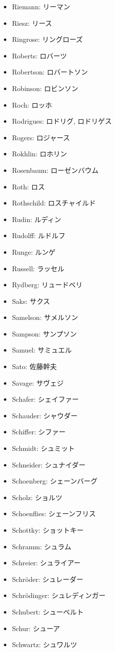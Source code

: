\documentclass[openany, a4paper, oneside]{jsbook}
\begin{document}
\begin{itemize}
\item Riemann: リーマン
\item Riesz: リース
\item Ringrose: リングローズ
\item Roberts: ロバーツ
\item Robertson: ロバートソン
\item Robinson: ロビンソン
\item Roch: ロッホ
\item Rodrigues: ロドリグ, ロドリゲス
\item Rogers: ロジャース
\item Rokhlin: ロホリン
\item Rosenbaum: ローゼンバウム
\item Roth: ロス
\item Rothschild: ロスチャイルド
\item Rudin: ルディン
\item Rudolff: ルドルフ
\item Runge: ルンゲ
\item Russell: ラッセル
\item Rydberg: リュードベリ
\item Saks: サクス
\item Samelson: サメルソン
\item Sampson: サンプソン
\item Samuel: サミュエル
\item Sato: 佐藤幹夫
\item Savage: サヴェジ
\item Schafer: シェイファー
\item Schauder: シャウダー
\item Schiffer: シファー
\item Schmidt: シュミット
\item Schneider: シュナイダー
\item Schoenberg: シェーンバーグ
\item Scholz: ショルツ
\item Schoenflies: シェーンフリス
\item Schottky: ショットキー
\item Schramm: シュラム
\item Schreier: シュライアー
\item Schr\"oder: シュレーダー
\item Schr\"odinger: シュレディンガー
\item Schubert: シューベルト
\item Schur: シューア
\item Schwartz: シュワルツ

\end{itemize}
\end{document}

